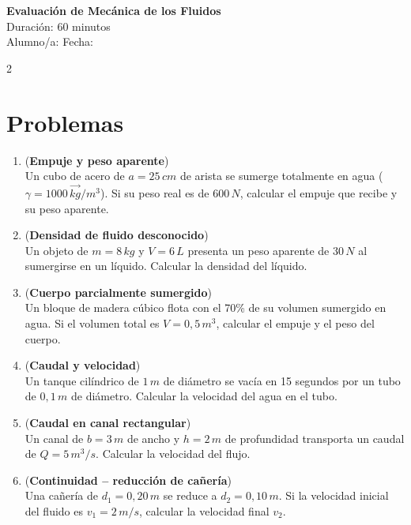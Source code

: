 \documentclass[a4paper,12pt]{article}
\begin{document}
\begin{center}
    \Large \textbf{Evaluación de Mecánica de los Fluidos} \\
    \normalsize Duración: 60 minutos \\
    Alumno/a: \underline{\hspace{6cm}} \hspace{0.5cm} Fecha: \underline{\hspace{2cm}}
\end{center}

\vspace{0.3cm}

\begin{multicols}{2}

\section*{Problemas}

\begin{enumerate}
\item (\textbf{Empuje y peso aparente})\\
Un cubo de acero de $a = 25\,cm$ de arista se sumerge totalmente en agua ($\gamma = 1000\,\vec{kg}/m^3$). Si su peso real es de $600\,N$, calcular el empuje que recibe y su peso aparente.

\item (\textbf{Densidad de fluido desconocido})\\
Un objeto de $m = 8\,kg$ y $V = 6\,L$ presenta un peso aparente de $30\,N$ al sumergirse en un líquido. Calcular la densidad del líquido.

\item (\textbf{Cuerpo parcialmente sumergido})\\
Un bloque de madera cúbico flota con el 70\% de su volumen sumergido en agua. Si el volumen total es $V = 0{,}5\,m^3$, calcular el empuje y el peso del cuerpo.

\item (\textbf{Caudal y velocidad})\\
Un tanque cilíndrico de $1\,m$ de diámetro se vacía en 15 segundos por un tubo de $0{,}1\,m$ de diámetro. Calcular la velocidad del agua en el tubo.

\item (\textbf{Caudal en canal rectangular})\\
Un canal de $b = 3\,m$ de ancho y $h = 2\,m$ de profundidad transporta un caudal de $Q = 5\,m^3/s$. Calcular la velocidad del flujo.

\item (\textbf{Continuidad – reducción de cañería})\\
Una cañería de $d_1 = 0{,}20\,m$ se reduce a $d_2 = 0{,}10\,m$. Si la velocidad inicial del fluido es $v_1 = 2\,m/s$, calcular la velocidad final $v_2$.

\end{enumerate}

\end{multicols}
\end{document}
